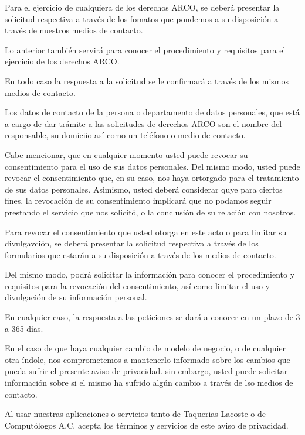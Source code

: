 \documentclass{article}
\begin{document}
\vspace{4mm}
\noindent
Para el ejercicio de cualquiera de los derechos ARCO, se deberá presentar la solicitud respectiva a través de los fomatos que pondemos a su disposición a través de nuestros medios de contacto.

\vspace{4mm}
\noindent
Lo anterior también servirá para conocer el procedimiento y requisitos para el ejercicio de los derechos ARCO.

\vspace{4mm}
\noindent
En todo caso la respuesta a la solicitud se le confirmará a través de los mismos medios de contacto.

\vspace{4mm}
\noindent
Los datos de contacto de la persona o departamento de datos personales, que está a cargo de dar trámite a las solicitudes de derechos ARCO son el nombre del responsable, su domiciio así como un teléfono o medio de contacto.

\vspace{4mm}
\noindent
Cabe mencionar, que en cualquier momento usted puede revocar su consentimiento para el uso de sus datos personales. Del mismo modo, usted puede revocar el consentimiento que, en su caso, nos haya ortorgado para el tratamiento de sus datos personales.
Asimismo, usted deberá considerar quye para ciertos fines, la revocación de su consentimiento implicará que no podamos seguir
prestando el servicio que nos solicitó, o la conclusión de su relación con nosotros.

\vspace{4mm}
\noindent
Para revocar el consentimiento que usted otorga en este acto o para limitar su divulgavción, se deberá presentar la solicitud
respectiva a través de los formularios que estarán a su disposición a través de los medios de contacto.

\vspace{4mm}
\noindent
Del mismo modo, podrá solicitar la información para conocer el procedimiento y requisitos para la revocación del consentimiento, así como limitar el uso y divulgación de su información personal.

\vspace{4mm}
\noindent
En cualquier caso, la respuesta a las peticiones se dará a conocer en un plazo de 3 a 365 días.

\vspace{4mm}
\noindent
En el caso de que haya cualquier cambio de modelo de negocio, o de cualquier otra índole, nos comprometemos a mantenerlo informado sobre los cambios que pueda sufrir el presente aviso de privacidad. sin embargo, usted puede solicitar información sobre si el mismo ha sufrido algún cambio a través de lso medios de contacto.

\vspace{4mm}
\noindent
Al usar nuestras aplicaciones o servicios tanto de Taquerias Lacoste o de Computólogos A.C. acepta los términos y servicios de este aviso de privacidad.
\end{document}
